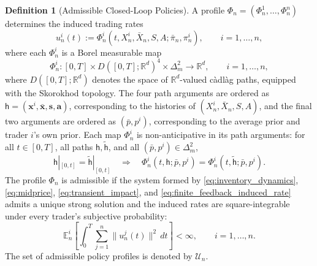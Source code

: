 \documentclass[12pt]{article}
\numberwithin{equation}{section}
\theoremstyle{definition}
\newtheorem{definition}[theorem]{Definition}
\begin{document}
\begin{definition}[Admissible Closed-Loop Policies]
\label{def:admissible_feedback_policies}
A profile \(\Phi_n=(\Phi_n^1,\ldots,\Phi_n^n)\) determines the induced
trading rates
\begin{equation}\label{eq:finite_feedback_induced_rate}
u_n^i(t)
:=
\Phi_n^i\left(
t,X_n^i,\bar X_n,S,A;\bar\pi_n,\pi_n^i
\right),
\qquad i=1,\ldots,n,
\end{equation}
where each \(\Phi_n^i\) is a Borel measurable map
\begin{equation}\label{eq:finite_feedback_policy_maps}
\Phi_n^i:
[0,T]\times D([0,T];\mathbb R^d)^4\times\Delta_m^2
\longrightarrow\mathbb R^d,
\qquad i=1,\ldots,n,
\end{equation}
where \(D([0,T];\mathbb R^d)\) denotes the space of \(\mathbb R^d\)-valued
càdlàg paths, equipped with the Skorokhod topology. The four path arguments
are ordered as \(\mathsf h=(\mathbf{x}^i,\bar{\mathbf{x}},\mathbf{s},\mathbf{a})\), corresponding
to the histories of \((X_n^i,\bar X_n,S,A)\), and the final two arguments are
ordered as \((\bar p,p^i)\), corresponding to the average prior and trader
\(i\)'s own prior. Each map \(\Phi_n^i\) is non-anticipative in its path
arguments: for all \(t\in[0,T]\), all paths \(\mathsf h,\widetilde{\mathsf h}\), and all
\((\bar p,p^i)\in\Delta_m^2\),
\begin{equation}\label{eq:finite_feedback_nonanticipativity}
\mathsf h|_{[0,t]}=\widetilde{\mathsf h}|_{[0,t]}
\quad\Longrightarrow\quad
\Phi_n^i(t,\mathsf h;\bar p,p^i)
=\Phi_n^i(t,\widetilde{\mathsf h};\bar p,p^i).
\end{equation}
The profile \(\Phi_n\) is admissible if the system formed by
\eqref{eq:inventory_dynamics}, \eqref{eq:midprice},
\eqref{eq:transient_impact}, and
\eqref{eq:finite_feedback_induced_rate} admits a unique strong solution and the
induced rates are square-integrable under every trader's subjective
probability:
\[
\mathbb E_n^i\left[
\int_0^T \sum_{j=1}^n \|u_n^j(t)\|^2\,dt
\right]
<\infty,
\qquad i=1,\dots,n.
\]
The set of admissible policy profiles is denoted by \(\mathcal U_n\).
\end{definition}
\end{document}
